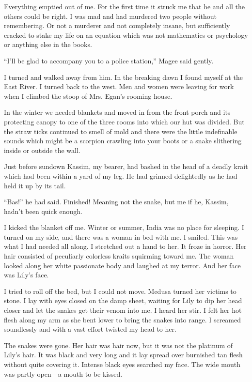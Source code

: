 \documentclass{novel}
\begin{document}
Everything emptied out of me. For the first time it struck me that he and all the others could be right. I was mad and had murdered two people without remembering. Or not a murderer and not completely insane, but sufficiently cracked to stake my life on an equation which was not mathematics or psychology or anything else in the books.

“I’ll be glad to accompany you to a police station,” Magee said gently.

I turned and walked away from him. In the breaking dawn I found myself at the East River. I turned back to the west. Men and women were leaving for work when I climbed the stoop of Mrs. Egan’s rooming house.

\scenestars

In the winter we needed blankets and moved in from the front porch and its protecting canopy to one of the three rooms into which our hut was divided. But the straw ticks continued to smell of mold and there were the little indefinable sounds which might be a scorpion crawling into your boots or a snake slithering inside or outside the wall. 

Just before sundown Kassim, my bearer, had bashed in the head of a deadly krait which had been within a yard of my leg. He had grinned delightedly as he had held it up by its tail. 

“Bas!” he had said. Finished! Meaning not the snake, but me if he, Kassim, hadn’t been quick enough.

I kicked the blanket off me. Winter or summer, India was no place for sleeping. I turned on my side, and there was a woman in bed with me. I smiled. This was what I had needed all along. I stretched out a hand to her. It froze in horror. Her hair consisted of peculiarly colorless kraits squirming toward me. The woman looked along her white passionate body and laughed at my terror. And her face was Lily’s face.

I tried to roll off the bed, but I could not move. Medusa turned her victims to stone. I lay with eyes closed on the damp sheet, waiting for Lily to dip her head closer and let the snakes get their venom into me. I heard her stir. I felt her hot flesh along my arm as she bent lower to bring the snakes into range. I screamed soundlessly and with a vast effort twisted my head to her.

The snakes were gone. Her hair was hair now, but it was not the platinum of Lily’s hair. It was black and very long and it lay spread over burnished tan flesh without quite covering it. Intense black eyes searched my face. The wide mouth was partly open—a mouth to be kissed.
\end{document}
